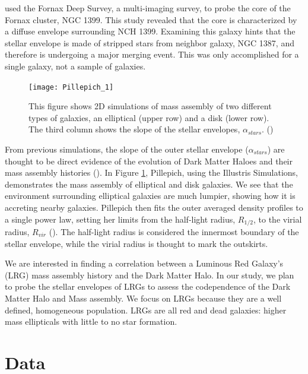 \documentclass[apj]{emulateapj}
\begin{document}
\cite{Iodice:2016} used the Fornax Deep Survey, a multi-imaging survey, to probe the core of the Fornax cluster, NGC 1399. This study revealed that the core is characterized by a diffuse envelope surrounding NCH 1399. Examining this galaxy hints that the stellar envelope is made of stripped stars from neighbor galaxy, NGC 1387, and therefore is undergoing a major merging event. This was only accomplished for a single galaxy, not a sample of galaxies.


\begin{figure}[htb!]
\centering
\texttt{[image: Pillepich\_1]}
\caption{\scriptsize{This figure shows 2D simulations of mass assembly of two different types of galaxies, an elliptical (upper row) and a disk (lower row). The third column shows the slope of the stellar envelopes, $\alpha_{stars}$. (\cite{Pillepich:2014})}}
\label{fig:meshaaa}
\end{figure}

From previous simulations, the slope of the outer stellar envelope ($\alpha_{stars}$) are thought to be direct evidence of the evolution of Dark Matter Haloes and their mass assembly histories (\cite{Pillepich:2014}). In Figure \ref{fig:meshaaa}, Pillepich, using the Illustris Simulations, demonstrates the mass assembly of elliptical and disk galaxies. We see that the environment surrounding elliptical galaxies are much lumpier, showing how it is accreting nearby galaxies. Pillepich then fits the outer averaged density profiles to a single power law, setting her limits from the half-light radius, $R_{1/2}$, to the virial radius, $R_{vir}$ (\cite{Pillepich:2014}). The half-light radius is considered the innermost boundary of the stellar envelope, while the virial radius is thought to mark the outskirts.

We are interested in finding a correlation between a Luminous Red Galaxy's (LRG) mass assembly history and the Dark Matter Halo. In our study, we plan to probe the stellar envelopes of LRGs to assess the codependence of the Dark Matter Halo and Mass assembly. We focus on LRGs because they are a well defined, homogeneous population. LRGs are all red and dead galaxies: higher mass ellipticals with little to no star formation.

\section{Data}
\end{document}
